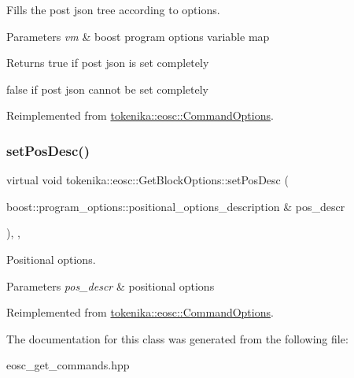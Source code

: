 Fills the post json tree according to options. 


\begin{DoxyParams}{Parameters}
{\em vm} & boost program options variable map \\
\hline
\end{DoxyParams}
\begin{DoxyReturn}{Returns}
true if post json is set completely 

false if post json cannot be set completely 
\end{DoxyReturn}


Reimplemented from \hyperlink{classtokenika_1_1eosc_1_1_command_options_a7aecc9aa79ca65f6abbd568ff8ff77a7}{tokenika\+::eosc\+::\+Command\+Options}.

\mbox{\label{classtokenika_1_1eosc_1_1_get_block_options_ac6f55ff885c6a553a16ee0b09a0d9da1}} 
\subsubsection{\texorpdfstring{set\+Pos\+Desc()}{setPosDesc()}}
{\footnotesize\ttfamily virtual void tokenika\+::eosc\+::\+Get\+Block\+Options\+::set\+Pos\+Desc (\begin{DoxyParamCaption}\item[{boost\+::program\+\_\+options\+::positional\+\_\+options\+\_\+description \&}]{pos\+\_\+descr }\end{DoxyParamCaption})\hspace{0.3cm}{\ttfamily [inline]}, {\ttfamily [protected]}, {\ttfamily [virtual]}}



Positional options. 


\begin{DoxyParams}{Parameters}
{\em pos\+\_\+descr} & positional options \\
\hline
\end{DoxyParams}


Reimplemented from \hyperlink{classtokenika_1_1eosc_1_1_command_options_ae2e98c683ae1eb3e5af1e81e60020447}{tokenika\+::eosc\+::\+Command\+Options}.



The documentation for this class was generated from the following file\+:\begin{DoxyCompactItemize}
\item 
eosc\+\_\+get\+\_\+commands.\+hpp\end{DoxyCompactItemize}
